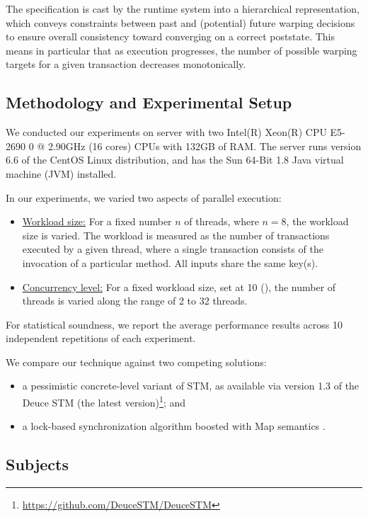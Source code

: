 The specification is cast by the runtime system into a hierarchical representation, which conveys constraints between past and (potential) future warping decisions to ensure overall consistency toward converging on a correct poststate. This means in particular that as execution progresses, the number of possible warping targets for a given transaction decreases monotonically.

\subsection{Methodology and Experimental Setup}

We conducted our experiments on server with two Intel(R) Xeon(R) CPU E5-2690 0 @ 2.90GHz (16 cores) CPUs with 132GB of RAM. The server runs version
6.6 of the CentOS Linux distribution, and has the Sun 64-Bit 1.8 Java virtual machine (JVM) installed.

In our experiments, we varied two aspects of parallel execution:
\begin{itemize}
	\item \underline{Workload size:} For a fixed number $n$ of threads, where $n=8$,  the workload size is varied. The workload is measured as the number of transactions executed by a given thread, where a single transaction consists of the invocation of a particular method. All inputs share the same key(s).
	\item \underline{Concurrency level:} For a fixed workload size, set at 10 (), the number of threads is varied along the range of 2 to 32 threads.  
\end{itemize}
For statistical soundness, we report the average performance results across 10 independent repetitions of each experiment.

We compare our technique against two competing solutions:
\begin{itemize}
	\item a pessimistic concrete-level variant of STM, as available via version 1.3 of the Deuce STM (the latest version)\footnote{
		\url{https://github.com/DeuceSTM/DeuceSTM}
	}; and
	\item a lock-based synchronization algorithm boosted with {\sf Map} semantics \cite{EricBoosting}.
\end{itemize}

\subsection{Subjects}

